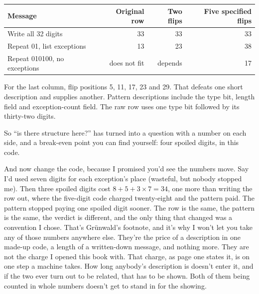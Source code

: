 \documentclass[11pt,twoside]{article}
\theoremstyle{thielethm}
\theoremstyle{thieledef}
\theoremstyle{thieledef}
\theoremstyle{thieledef}
\theoremstyle{thielethm}
\theoremstyle{thieleobs}
\theoremstyle{thielethm}
\begin{document}
\begin{center}
\small
\begin{tabular}{@{}lrrr@{}}
Message & Original row & Two flips & Five specified flips\\ \hline
Write all 32 digits & 33 & 33 & 33\\
Repeat 01, list exceptions & 13 & 23 & 38\\
Repeat 010100, no exceptions & does not fit & depends & 17\\ \hline
\end{tabular}

\footnotesize For the last column, flip positions 5, 11, 17, 23 and 29. That defeats one
short description and supplies another. Pattern descriptions include the type bit,
length field and exception-count field. The raw row uses one type bit followed by
its thirty-two digits.
\end{center}

So ``is there structure here?'' has turned into a question with a number on each side, and a break-even point you can find yourself: four spoiled digits, in this code.

And now change the code, because I promised you'd see the numbers move. Say I'd used seven digits for each exception's place (wasteful, but nobody stopped me). Then three spoiled digits cost $8 + 5 + 3 \times 7 = 34$, one more than writing the row out, where the five-digit code charged twenty-eight and the pattern paid. The pattern stopped paying one spoiled digit sooner. The row is the same, the pattern is the same, the verdict is different, and the only thing that changed was a convention I chose. That's Grünwald's footnote, and it's why I won't let you take any of those numbers anywhere else. They're the price of a description in one made-up code, a length of a written-down message, and nothing more. They are not the charge I opened this book with. That charge, as page one states it, is on one step a machine takes. How long anybody's description is doesn't enter it, and if the two ever turn out to be related, that has to be shown. Both of them being counted in whole numbers doesn't get to stand in for the showing.
\end{document}
